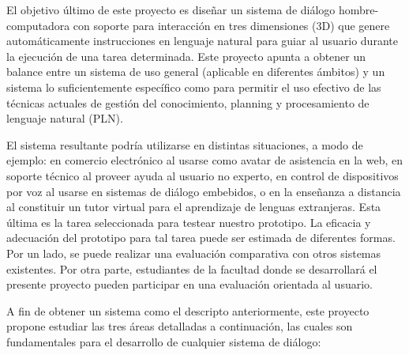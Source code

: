 
El objetivo \'ultimo de este proyecto es dise\~nar un sistema de di\'alogo
hombre-computadora con soporte para interacci\'on en tres dimensiones (3D) que
genere autom\'aticamente instrucciones en lenguaje natural para guiar  al
usuario durante la ejecuci\'on de una tarea determinada. Este proyecto apunta
a obtener un balance entre un sistema de uso general (aplicable en
diferentes \'ambitos) y un sistema lo suficientemente espec\'ifico
como para permitir el uso efectivo de las t\'ecnicas actuales de
gesti\'on del conocimiento, planning y procesamiento de lenguaje
natural (PLN).

El sistema resultante podr\'ia utilizarse en distintas situaciones, a modo de
ejemplo:
en comercio electr\'onico  al usarse como avatar de asistencia en la web, en
soporte t\'ecnico al proveer ayuda al usuario no experto, en
control de dispositivos por voz al usarse en sistemas de di\'alogo embebidos, o
en la ense\~nanza a distancia al constituir un tutor virtual para el aprendizaje
de lenguas extranjeras. Esta \'ultima es la tarea seleccionada para testear
nuestro prototipo. La eficacia y adecuaci\'on del prototipo para
tal tarea puede ser estimada de diferentes formas. Por un lado, se puede realizar 
una evaluaci\'on comparativa con
otros sistemas existentes. Por otra parte, estudiantes de la facultad donde se desarrollar\'a
el presente proyecto pueden participar en una evaluaci\'on orientada al usuario.


A fin de obtener un sistema como el descripto anteriormente, este proyecto
propone estudiar las tres \'areas detalladas a continuaci\'on, las cuales son 
fundamentales para el desarrollo de cualquier sistema de di\'alogo:


